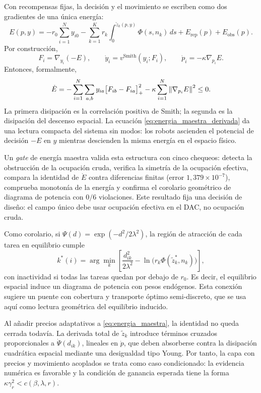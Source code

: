Con recompensas fijas, la decisión y el movimiento se escriben como dos gradientes de
una única energía:
\begin{equation}
  E(p,y)=
  -r_0\sum_{i=1}^{N}y_{i0}
  -\sum_{k=1}^{K} r_k\int_{0}^{\tilde z_k(p,y)}\Phi(s,n_k)\,ds
  +E_{\mathrm{rep}}(p)+E_{\mathrm{obs}}(p).
  \label{eq:energia_maestra}
\end{equation}
Por construcción,
\[
  F_i=\nabla_{y_i}(-E),\qquad
  \dot y_i=v^{\mathrm{Smith}}(y_i;F_i),\qquad
  \dot p_i=-\kappa\nabla_{p_i}E .
\]
Entonces, formalmente,
\begin{equation}
  \dot E =
  -\sum_{i=1}^{N}\sum_{a,b} y_{ia}
  \bigl[F_{ib}-F_{ia}\bigr]_{+}^{2}
  -\kappa\sum_{i=1}^{N}\left\|\nabla_{p_i}E\right\|^{2}
  \le 0 .
  \label{eq:energia_maestra_derivada}
\end{equation}
La primera disipación es la correlación positiva de Smith; la segunda es la disipación
del descenso espacial. La ecuación \eqref{eq:energia_maestra_derivada} da una lectura
compacta del sistema sin modos: los robots ascienden el potencial de decisión
$-E$ en $y$ mientras descienden la misma energía en el espacio físico.

Un \emph{gate} de energía maestra valida esta estructura con
cinco chequeos: detecta la obstrucción de la ocupación cruda, verifica la simetría de la
ocupación efectiva, compara la identidad de $\dot E$ contra diferencias finitas
(error $1{,}379\times10^{-7}$), comprueba monotonía de la energía y confirma el
corolario geométrico de diagrama de potencia con $0/6$ violaciones. Este resultado fija
una decisión de diseño: el campo único debe usar ocupación efectiva en el DAC, no
ocupación cruda.

Como corolario, si $\Psi(d)=\exp(-d^2/2\lambda^2)$, la región de atracción de cada tarea
en equilibrio cumple
\begin{equation}
  k^*(i)=
  \arg\min_k
  \left[
    \frac{d_{ik}^{2}}{2\lambda^{2}}
    -\ln\!\bigl(r_k\Phi(\tilde z_k^*,n_k)\bigr)
  \right],
  \label{eq:diagrama_potencia}
\end{equation}
con inactividad si todas las tareas quedan por debajo de $r_0$. Es decir, el equilibrio
espacial induce un diagrama de potencia con pesos endógenos. Esta conexión sugiere un
puente con cobertura y transporte óptimo semi-discreto, que se usa aquí como lectura
geométrica del equilibrio inducido.

Al añadir precios adaptativos a \eqref{eq:energia_maestra}, la identidad no queda
cerrada todavía. La derivada total de $\tilde z_k$ introduce términos cruzados
proporcionales a $\dot\Psi(d_{ik})$, lineales en $\dot p$, que deben absorberse contra
la disipación cuadrática espacial mediante una desigualdad tipo Young. Por tanto, la
capa con precios y movimiento acoplados se trata como caso condicionado: la evidencia
numérica es favorable y la condición de ganancia esperada tiene la forma
$\kappa\gamma_r^2<c(\beta,\lambda,r)$.

